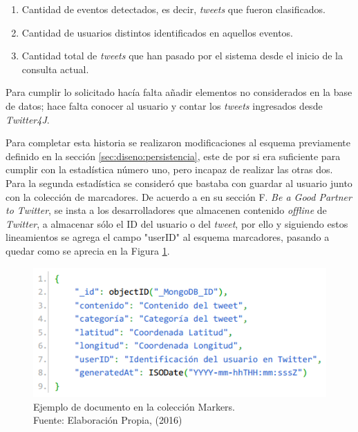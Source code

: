 \begin{enumerate}
\item Cantidad de eventos detectados, es decir, \textit{tweets} que fueron clasificados.
\item Cantidad de usuarios distintos identificados en aquellos eventos.
\item Cantidad total de \textit{tweets} que han pasado por el sistema desde el inicio de la consulta actual.
\end{enumerate}

Para cumplir lo solicitado hacía falta añadir elementos no considerados en la base de datos; hace falta conocer al usuario y contar los \textit{tweets} ingresados desde \textit{Twitter4J}.

Para completar esta historia se realizaron modificaciones al esquema previamente definido en la sección \ref{sec:diseno:persistencia}, este de por si era suficiente para cumplir con la estadística número uno, pero incapaz de realizar las otras dos. Para la segunda estadística se consideró que bastaba con guardar al usuario junto con la colección de marcadores. De acuerdo a \cite{TwitterAgreement} en su sección F. \textit{Be a Good Partner to Twitter}, se insta a los desarrolladores que almacenen contenido \textit{offline} de \textit{Twitter}, a almacenar sólo el ID del usuario o del \textit{tweet}, por ello y siguiendo estos lineamientos se agrega el campo "userID" al esquema marcadores, pasando a quedar como se aprecia en la Figura \ref{fig:esquemaMarker2}.

\begin{figure}[H]
	\centering
	\captionsetup{justification=centering}
	\includegraphics[scale=0.8]{images/Marker2.png}
	\caption[Ejemplo de documento en la colección Markers.]{Ejemplo de documento en la colección Markers.\\Fuente: Elaboración Propia, (2016)}
	\label{fig:esquemaMarker2}
\end{figure}

